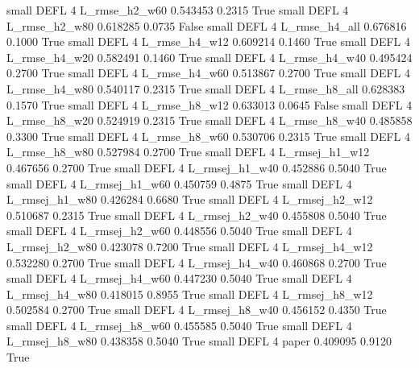      small     DEFL                 4  L_rmse_h2_w60   0.543453      0.2315    True
     small     DEFL                 4  L_rmse_h2_w80   0.618285      0.0735   False
     small     DEFL                 4  L_rmse_h4_all   0.676816      0.1000    True
     small     DEFL                 4  L_rmse_h4_w12   0.609214      0.1460    True
     small     DEFL                 4  L_rmse_h4_w20   0.582491      0.1460    True
     small     DEFL                 4  L_rmse_h4_w40   0.495424      0.2700    True
     small     DEFL                 4  L_rmse_h4_w60   0.513867      0.2700    True
     small     DEFL                 4  L_rmse_h4_w80   0.540117      0.2315    True
     small     DEFL                 4  L_rmse_h8_all   0.628383      0.1570    True
     small     DEFL                 4  L_rmse_h8_w12   0.633013      0.0645   False
     small     DEFL                 4  L_rmse_h8_w20   0.524919      0.2315    True
     small     DEFL                 4  L_rmse_h8_w40   0.485858      0.3300    True
     small     DEFL                 4  L_rmse_h8_w60   0.530706      0.2315    True
     small     DEFL                 4  L_rmse_h8_w80   0.527984      0.2700    True
     small     DEFL                 4 L_rmsej_h1_w12   0.467656      0.2700    True
     small     DEFL                 4 L_rmsej_h1_w40   0.452886      0.5040    True
     small     DEFL                 4 L_rmsej_h1_w60   0.450759      0.4875    True
     small     DEFL                 4 L_rmsej_h1_w80   0.426284      0.6680    True
     small     DEFL                 4 L_rmsej_h2_w12   0.510687      0.2315    True
     small     DEFL                 4 L_rmsej_h2_w40   0.455808      0.5040    True
     small     DEFL                 4 L_rmsej_h2_w60   0.448556      0.5040    True
     small     DEFL                 4 L_rmsej_h2_w80   0.423078      0.7200    True
     small     DEFL                 4 L_rmsej_h4_w12   0.532280      0.2700    True
     small     DEFL                 4 L_rmsej_h4_w40   0.460868      0.2700    True
     small     DEFL                 4 L_rmsej_h4_w60   0.447230      0.5040    True
     small     DEFL                 4 L_rmsej_h4_w80   0.418015      0.8955    True
     small     DEFL                 4 L_rmsej_h8_w12   0.502584      0.2700    True
     small     DEFL                 4 L_rmsej_h8_w40   0.456152      0.4350    True
     small     DEFL                 4 L_rmsej_h8_w60   0.455585      0.5040    True
     small     DEFL                 4 L_rmsej_h8_w80   0.438358      0.5040    True
     small     DEFL                 4          paper   0.409095      0.9120    True

